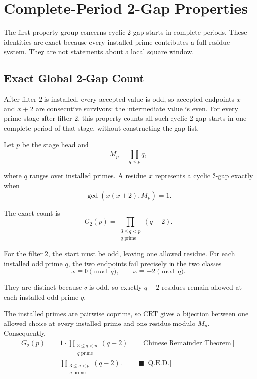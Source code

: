 \section{Complete-Period 2-Gap Properties}
\label{sec:complete-period-two-gap-properties}

The first property group concerns cyclic 2-gap starts in complete
periods. These identities are exact because every installed prime
contributes a full residue system. They are not statements about a local
square window.

\subsection{Exact Global 2-Gap Count}
\label{sec:exact-global-two-gap-count}

After filter $2$ is installed, every accepted value is odd, so accepted
endpoints $x$ and $x+2$ are consecutive survivors: the intermediate value
is even. For every prime stage after filter $2$, this property counts all
such cyclic 2-gap starts in one complete period of that stage, without
constructing the gap list.

Let $p$ be the stage head and
\begin{equation*}
M_p=\prod_{q\lt p}q,
\end{equation*}

where $q$ ranges over installed primes. A residue $x$ represents a cyclic
2-gap exactly when
\begin{equation*}
\gcd(x(x+2),M_p)=1.
\end{equation*}

The exact count is
\begin{equation*}
G_2(p)
=
\prod_{\substack{3\le q\lt p\\q\text{ prime}}}(q-2).
\end{equation*}

For the filter $2$, the start must be odd, leaving one allowed residue.
For each installed odd prime $q$, the two endpoints fail precisely in the
two classes
\begin{equation*}
x\equiv0\pmod q,
\qquad
x\equiv-2\pmod q.
\end{equation*}

They are distinct because $q$ is odd, so exactly $q-2$ residues remain
allowed at each installed odd prime $q$.

The installed primes are pairwise coprime, so CRT gives a bijection
between one allowed choice at every installed prime and one residue
modulo $M_p$. Consequently,
\begin{equation*}
\begin{aligned}
G_2(p)
&=1\cdot
\prod_{\substack{3\le q\lt p\\q\text{ prime}}}
(q-2)
&&[\text{Chinese Remainder Theorem}]\\
&=\prod_{\substack{3\le q\lt p\\q\text{ prime}}}(q-2).
&&\blacksquare\ \text{[Q.E.D.]}
\end{aligned}
\end{equation*}

